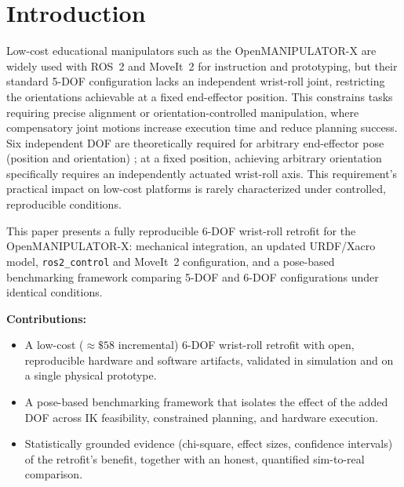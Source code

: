 \documentclass[conference]{IEEEtran}
\begin{document}
	\section{Introduction}
	\label{sec:introduction}
	
	Low-cost educational manipulators such as the OpenMANIPULATOR-X
	\cite{robotis2023openmanipulator} are widely used with ROS~2
	\cite{al2024ros} and MoveIt~2 \cite{chitta2016moveit} for instruction
	and prototyping, but their standard 5-DOF configuration lacks an
	independent wrist-roll joint, restricting the orientations achievable
	at a fixed end-effector position. This constrains tasks requiring
	precise alignment or orientation-controlled manipulation, where
	compensatory joint motions increase execution time and reduce
	planning success. Six independent DOF are theoretically required
	for arbitrary end-effector pose (position and orientation)
	\cite{craig2005introduction, whitney1969resolved}; at a fixed
	position, achieving arbitrary orientation specifically requires an
	independently actuated wrist-roll axis. This requirement's practical
	impact on low-cost platforms is rarely characterized under
	controlled, reproducible conditions.
	
	This paper presents a fully reproducible 6-DOF wrist-roll retrofit
	for the OpenMANIPULATOR-X: mechanical integration, an updated
	URDF/Xacro model, \texttt{ros2\_control} and MoveIt~2 configuration,
	and a pose-based benchmarking framework comparing 5-DOF and 6-DOF
	configurations under identical conditions.
	
	\textbf{Contributions:}
	\begin{itemize}[leftmargin=*,itemsep=1pt,topsep=2pt]
		\item A low-cost (${\approx}\$58$ incremental) 6-DOF wrist-roll
		retrofit with open, reproducible hardware and software artifacts,
		validated in simulation and on a single physical prototype.
		\item A pose-based benchmarking framework that isolates the
		effect of the added DOF across IK feasibility, constrained
		planning, and hardware execution.
		\item Statistically grounded evidence (chi-square, effect sizes,
		confidence intervals) of the retrofit's benefit, together with
		an honest, quantified sim-to-real comparison.
	\end{itemize}
	
\end{document}
